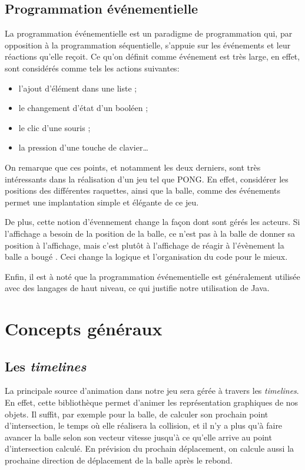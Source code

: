 \documentclass[a4paper,10pt]{article}
\theoremstyle{definition}
\begin{document}
	
  \subsection{Programmation événementielle}
	La programmation événementielle est un paradigme de programmation qui, par opposition à la programmation séquentielle, s'appuie sur les événements et leur réactions qu'elle reçoit. Ce qu'on définit comme \og événement \fg{} est très large, en effet, sont considérés comme tels les actions suivantes:
	\begin{itemize}
		\item l'ajout d'élément dans une liste ;
		\item le changement d'état d'un booléen ;
		\item le clic d'une souris ;
		\item la pression d'une touche de clavier\dots
	\end{itemize} 
	
	On remarque que ces points, et notamment les deux derniers, sont très intéressants dans la réalisation d'un jeu tel que PONG. En effet, considérer les positions des différentes raquettes, ainsi que la balle, comme des événements permet une implantation simple et élégante de ce jeu.

	De plus, cette notion d'évennement change la façon dont sont gérés les acteurs. Si l'affichage a besoin de la position de la balle, ce n'est pas à la balle de donner sa position à l'affichage, mais c'est plutôt à l'affichage de réagir à l'évènement \og la balle a bougé \fg. Ceci change la logique et l'organisation du code pour le mieux.
	
	Enfin, il est à noté que la programmation événementielle est généralement utilisée avec des langages de haut niveau, ce qui justifie notre utilisation de Java.
	
\section{Concepts généraux}
%

    \subsection{Les \emph{timelines}}
    La principale source d'animation dans notre jeu sera gérée à travers les \emph{timelines}. En effet, cette bibliothèque permet d'animer les représentation graphiques de nos objets. Il suffit, par exemple pour la balle, de calculer son prochain point d'intersection, le temps où elle réalisera la collision, et il n'y a plus qu'à faire avancer la balle selon son vecteur vitesse jusqu'à ce qu'elle arrive au point d'intersection calculé. En prévision du prochain déplacement, on calcule aussi la prochaine direction de déplacement de la balle après le rebond.
    
\end{document}
